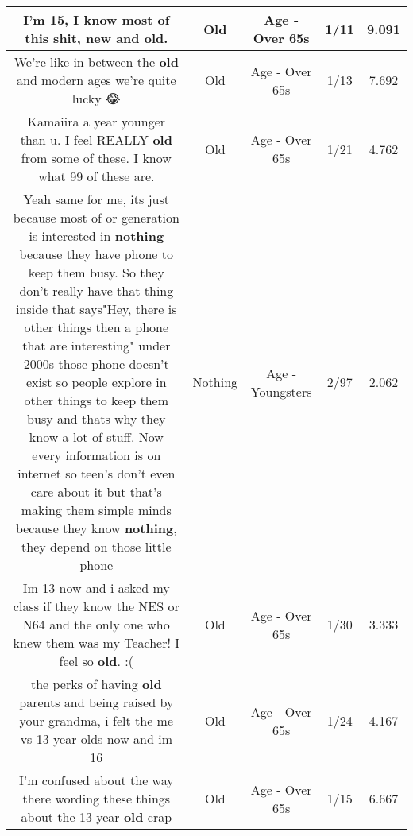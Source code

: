 \documentclass[11pt]{article}
\newlength\mylength
\begin{document}
\begin{center}
\begin{longtable}{|C{.65\mylength}|C{.30\mylength}|C{.12\mylength}|C{.12\mylength}|C{.12\mylength}|}
  \small I'm 15, I know most of this shit, new and \textbf{old}.\normalsize   & Old & Age - Over 65s & 1/11 & 9.091 \\  \hline
  \small We're like in between the \textbf{old} and modern ages we're quite lucky 😂\normalsize   & Old & Age - Over 65s & 1/13 & 7.692 \\  \hline
  \small Kamaiira a year younger than u. I feel REALLY \textbf{old} from some of these. I know what 99 of these are.\normalsize   & Old & Age - Over 65s & 1/21 & 4.762 \\  \hline
  \small Yeah same for me, its just because most of or generation is interested in \textbf{nothing} because they have phone to keep them busy. So they don't really have that thing inside that says"Hey, there is other things then a phone that are interesting" under 2000s those phone doesn't exist so people explore in other things to keep them busy and thats why they know a lot of stuff. Now every information is on internet so teen's don't even care about it but that's making them simple minds because they know \textbf{nothing}, they depend on those little phone\normalsize   & Nothing & Age - Youngsters & 2/97 & 2.062 \\  \hline
  \small Im 13 now and i asked my class if they know the NES or N64 and the only one who knew them was my Teacher! I feel so \textbf{old}. :(\normalsize   & Old & Age - Over 65s & 1/30 & 3.333 \\  \hline
  \small the perks of having \textbf{old} parents and being raised by your grandma, i felt the me vs 13 year olds now and im 16\normalsize   & Old & Age - Over 65s & 1/24 & 4.167 \\  \hline
  \small I'm confused about the way there wording these things about the 13 year \textbf{old} crap\normalsize   & Old & Age - Over 65s & 1/15 & 6.667 \\  \hline

\end{longtable}
\end{center}
\end{document}
